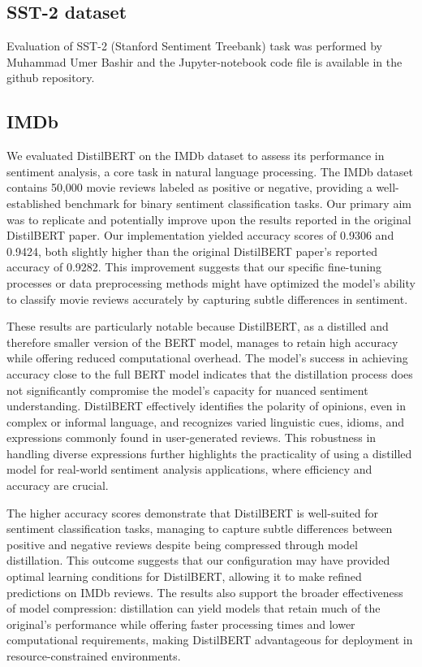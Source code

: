 \documentclass[
  11pt,
]{article}
\begin{document}
\subsection{SST-2 dataset}\label{sst-2-dataset-1}

Evaluation of SST-2 (Stanford Sentiment Treebank) task was performed by
Muhammad Umer Bashir and the Jupyter-notebook code file is available in
the github repository.

\subsection{IMDb}\label{sst-2-dataset-1}

We evaluated DistilBERT on the IMDb dataset to assess its performance in sentiment analysis, a core task in natural language processing. The IMDb dataset contains 50,000 movie reviews labeled as positive or negative, providing a well-established benchmark for binary sentiment classification tasks. Our primary aim was to replicate and potentially improve upon the results reported in the original DistilBERT paper. Our implementation yielded accuracy scores of 0.9306 and 0.9424, both slightly higher than the original DistilBERT paper's reported accuracy of 0.9282. This improvement suggests that our specific fine-tuning processes or data preprocessing methods might have optimized the model’s ability to classify movie reviews accurately by capturing subtle differences in sentiment.

These results are particularly notable because DistilBERT, as a distilled and therefore smaller version of the BERT model, manages to retain high accuracy while offering reduced computational overhead. The model’s success in achieving accuracy close to the full BERT model indicates that the distillation process does not significantly compromise the model’s capacity for nuanced sentiment understanding. DistilBERT effectively identifies the polarity of opinions, even in complex or informal language, and recognizes varied linguistic cues, idioms, and expressions commonly found in user-generated reviews. This robustness in handling diverse expressions further highlights the practicality of using a distilled model for real-world sentiment analysis applications, where efficiency and accuracy are crucial.

The higher accuracy scores demonstrate that DistilBERT is well-suited for sentiment classification tasks, managing to capture subtle differences between positive and negative reviews despite being compressed through model distillation. This outcome suggests that our configuration may have provided optimal learning conditions for DistilBERT, allowing it to make refined predictions on IMDb reviews. The results also support the broader effectiveness of model compression: distillation can yield models that retain much of the original’s performance while offering faster processing times and lower computational requirements, making DistilBERT advantageous for deployment in resource-constrained environments.
\end{document}
